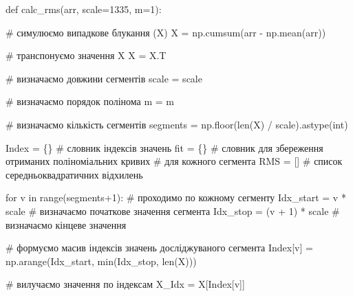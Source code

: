 \documentclass[
  letterpaper,
]{report}
\newenvironment{Shaded}{\begin{snugshade}}{\end{snugshade}}
\newcommand{\BuiltInTok}[1]{\textcolor[rgb]{0.00,0.23,0.31}{#1}}
\newcommand{\CommentTok}[1]{\textcolor[rgb]{0.37,0.37,0.37}{#1}}
\newcommand{\ControlFlowTok}[1]{\textcolor[rgb]{0.00,0.23,0.31}{#1}}
\newcommand{\DecValTok}[1]{\textcolor[rgb]{0.68,0.00,0.00}{#1}}
\newcommand{\KeywordTok}[1]{\textcolor[rgb]{0.00,0.23,0.31}{#1}}
\newcommand{\NormalTok}[1]{\textcolor[rgb]{0.00,0.23,0.31}{#1}}
\newcommand{\OperatorTok}[1]{\textcolor[rgb]{0.37,0.37,0.37}{#1}}
\begin{document}
\begin{Shaded}
\begin{Highlighting}[]
\KeywordTok{def}\NormalTok{ calc\_rms(arr, scale}\OperatorTok{=}\DecValTok{1335}\NormalTok{, m}\OperatorTok{=}\DecValTok{1}\NormalTok{):}
    
    \CommentTok{\# симулюємо випадкове блукання (X)}
\NormalTok{    X }\OperatorTok{=}\NormalTok{ np.cumsum(arr }\OperatorTok{{-}}\NormalTok{ np.mean(arr))}

    \CommentTok{\# транспонуємо значення X }
\NormalTok{    X }\OperatorTok{=}\NormalTok{ X.T                           }

    \CommentTok{\# визначаємо довжини сегментів }
\NormalTok{    scale }\OperatorTok{=}\NormalTok{ scale}
    
    \CommentTok{\# визначаємо порядок полінома}
\NormalTok{    m }\OperatorTok{=}\NormalTok{ m}

    \CommentTok{\# визначаємо кількість сегментів}
\NormalTok{    segments }\OperatorTok{=}\NormalTok{ np.floor(}\BuiltInTok{len}\NormalTok{(X) }\OperatorTok{/}\NormalTok{ scale).astype(}\BuiltInTok{int}\NormalTok{)}

\NormalTok{    Index }\OperatorTok{=}\NormalTok{ \{\}  }\CommentTok{\# словник індексів значень}
\NormalTok{    fit }\OperatorTok{=}\NormalTok{ \{\}    }\CommentTok{\# словник для збереження отриманих поліноміальних кривих}
                \CommentTok{\# для кожного сегмента}
\NormalTok{    RMS }\OperatorTok{=}\NormalTok{ []    }\CommentTok{\# список середньоквадратичних відхилень}

    \ControlFlowTok{for}\NormalTok{ v }\KeywordTok{in} \BuiltInTok{range}\NormalTok{(segments}\OperatorTok{+}\DecValTok{1}\NormalTok{):       }\CommentTok{\# проходимо по кожному сегменту}
\NormalTok{        Idx\_start }\OperatorTok{=}\NormalTok{ v }\OperatorTok{*}\NormalTok{ scale         }\CommentTok{\# визначаємо початкове значення сегмента                                           }
\NormalTok{        Idx\_stop }\OperatorTok{=}\NormalTok{ (v }\OperatorTok{+} \DecValTok{1}\NormalTok{) }\OperatorTok{*}\NormalTok{ scale    }\CommentTok{\# визначаємо кінцеве значення}
        
        \CommentTok{\# формуємо масив індексів значень досліджуваного сегмента}
\NormalTok{        Index[v] }\OperatorTok{=}\NormalTok{ np.arange(Idx\_start, }\BuiltInTok{min}\NormalTok{(Idx\_stop, }\BuiltInTok{len}\NormalTok{(X)))  }

        \CommentTok{\# вилучаємо значення по індексам}
\NormalTok{        X\_Idx }\OperatorTok{=}\NormalTok{ X[Index[v]]                       }


\end{Highlighting}
\end{Shaded}
\end{document}
